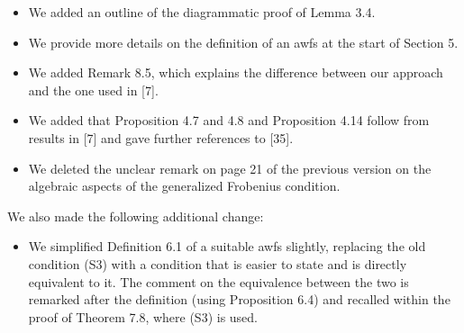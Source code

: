 \documentclass[reqno,10pt,a4paper,oneside,draft]{amsart}
\begin{document}
\begin{itemize}
\item We added an outline of the diagrammatic proof of Lemma 3.4. 
\item We provide more details on the definition of an awfs at the start of Section 5. 
\item We added Remark 8.5, which explains the difference between our approach and the one used in [7]. 
\item We added that Proposition 4.7 and 4.8 and Proposition 4.14 follow from results in [7] and gave further references to [35]. 
\item We deleted the unclear remark on page 21 of the previous version on the algebraic aspects of the generalized Frobenius condition.
\end{itemize}


We also made the following additional change:
\begin{itemize}
\item We simplified Definition 6.1 of a suitable awfs slightly, replacing the old condition (S3) with a condition that is
easier to state and is directly equivalent to it. The comment on the equivalence between the two is remarked after
the definition (using Proposition 6.4) and recalled within the proof of Theorem 7.8, where (S3) is used.
\end{itemize}
\end{document}
